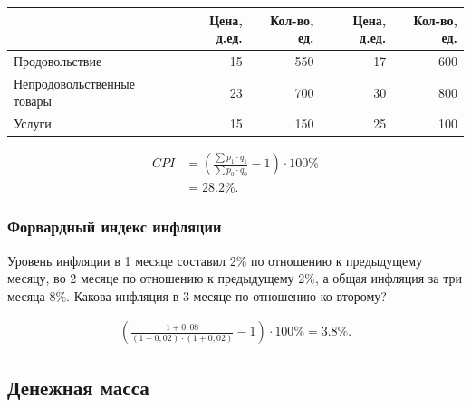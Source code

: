 \documentclass[12pt, table, a4paper,twoside]{exam}
\begin{document}
\begin{questions}
\begin{tabularx}{\linewidth}[b]{@{}>{\raggedright\arraybackslash}Xrrrr@{}}
	\toprule
	& Цена, д.ед. & Кол-во, ед. & Цена, д.ед. & Кол-во, ед. \\
	\midrule
	Продовольствие & 15    & 550   & 17    & 600 \\
	Непродовольственные товары & 23    & 700   & 30    & 800 \\
	Услуги & 15    & 150   & 25    & 100 \\
	\bottomrule
\end{tabularx}%

\begin{solution}[12em]
	\begin{align}
	CPI &=\left( \frac{\sum p_1 \cdot q_1}{\sum p_0 \cdot q_0} - 1 \right) \cdot 100\%\\
	&=28.2\%.\nonumber
	\end{align}
\end{solution}

\subsubsection{Форвардный индекс инфляции}
\question[10] Уровень инфляции в 1 месяце составил 2\% по отношению к предыдущему месяцу, во 2 месяце по отношению к предыдущему 2\%, а общая инфляция за три месяца 8\%. Какова инфляция в 3 месяце по отношению ко второму?

\begin{solution}[12em]
	\begin{align*}
	\left( \frac{1+0,08}{(1 + 0,02) \cdot (1 + 0,02)} - 1 \right) \cdot 100\%= 3.8\%.
	\end{align*}
\end{solution}

\vfill\null
\pagebreak
\subsection{Денежная масса}

\end{questions}
\end{document}
